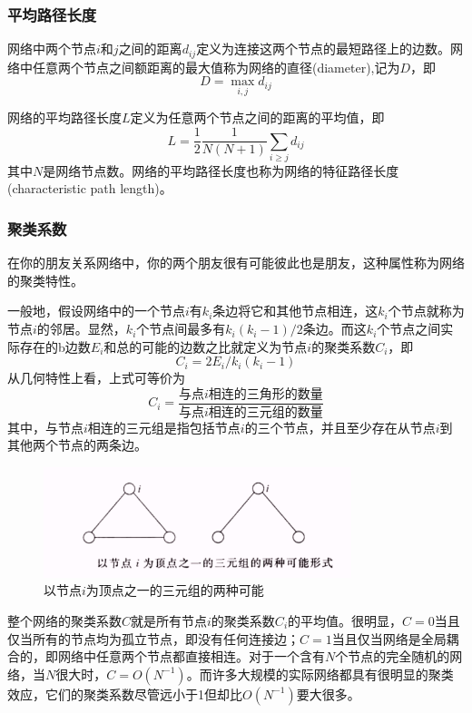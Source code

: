 \documentclass[11pt]{article}
\begin{document}
		
		\subsubsection*{平均路径长度}
				网络中两个节点$i$和$j$之间的距离$d_{ij}$定义为连接这两个节点的最短路径上的边数。网络中任意两个节点之间额距离的最大值称为网络的直径(diameter),记为$D$，即
				$$D = \max\limits_{i,j}d_{ij}$$ \par
				网络的平均路径长度$L$定义为任意两个节点之间的距离的平均值，即
				$$L = \frac{1}{2} \frac{1}{N(N+1)}\sum\limits_{i \ge j}d_{ij}$$ 
				其中$N$是网络节点数。网络的平均路径长度也称为网络的特征路径长度(characteristic path length)。
		
		\subsubsection*{聚类系数}	
			在你的朋友关系网络中，你的两个朋友很有可能彼此也是朋友，这种属性称为网络的聚类特性。\par
			一般地，假设网络中的一个节点$i$有$k_i$条边将它和其他节点相连，这$k_i$个节点就称为节点$i$的邻居。显然，$k_i$个节点间最多有$k_i(k_i-1)/2$条边。而这$k_i$个节点之间实际存在的b边数$E_i$和总的可能的边数之比就定义为节点$i$的聚类系数$C_i$，即
				$$ C_i = 2E_i / k_i (k_i - 1)$$
			从几何特性上看，上式可等价为
			$$C_i = \frac{\text{与点}i\text{相连的三角形的数量} }{\text{与点}i\text{相连的三元组的数量}}$$	
			其中，与节点$i$相连的三元组是指包括节点$i$的三个节点，并且至少存在从节点$i$到其他两个节点的两条边。
			
			\begin{figure}[htbp]
				\centering
			 	\includegraphics[width=0.8\textwidth]{pic/01-three.png}
				\caption{以节点$i$为顶点之一的三元组的两种可能}
			\end{figure}
			\par
			整个网络的聚类系数$C$就是所有节点$i$的聚类系数$C_i$的平均值。很明显，$C=0$当且仅当所有的节点均为孤立节点，即没有任何连接边；$C=1$当且仅当网络是全局耦合的，即网络中任意两个节点都直接相连。对于一个含有$N$个节点的完全随机的网络，当$N$很大时，$C=O(N^{-1})$。而许多大规模的实际网络都具有很明显的聚类效应，它们的聚类系数尽管远小于1但却比$O(N^{-1})$要大很多。
			
\end{document}
